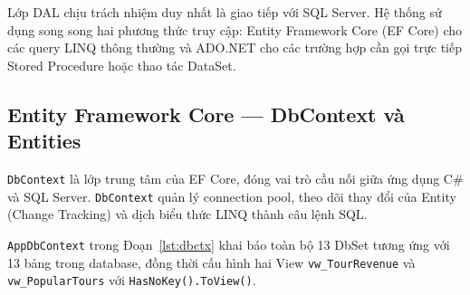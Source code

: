Lớp DAL chịu trách nhiệm duy nhất là giao tiếp với SQL Server.
Hệ thống sử dụng song song hai phương thức truy cập: Entity
Framework Core (EF Core) cho các query LINQ thông thường và
ADO.NET cho các trường hợp cần gọi trực tiếp Stored Procedure
hoặc thao tác DataSet.

\subsection{Entity Framework Core — DbContext và Entities}
  \label{sub3.4.1}

\texttt{DbContext} là lớp trung tâm của EF Core, đóng vai trò
cầu nối giữa ứng dụng C\# và SQL Server. \texttt{DbContext}
quản lý connection pool, theo dõi thay đổi của Entity
(Change Tracking) và dịch biểu thức LINQ thành câu lệnh SQL.

\texttt{AppDbContext} trong Đoạn~\ref{lst:dbctx} khai báo
toàn bộ 13 DbSet tương ứng với 13 bảng trong database, đồng
thời cấu hình hai View \texttt{vw\_TourRevenue} và
\texttt{vw\_PopularTours} với \texttt{HasNoKey().ToView()}.

